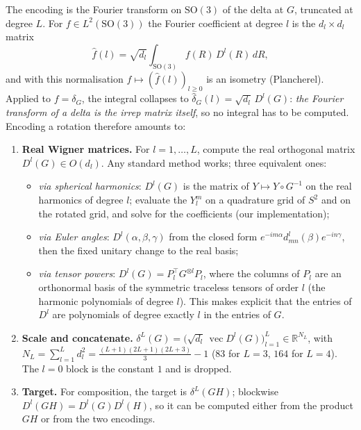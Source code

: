 \documentclass[a4paper,11pt]{article}
\theoremstyle{remark}
\theoremstyle{definition}
\newcommand{\R}{\mathbb{R}}
\newcommand{\vect}{\operatorname{vec}}
\newcommand{\SO}{\mathrm{SO}(3)}
\begin{document}
The encoding is the Fourier transform on $\SO$ of the delta at $G$, truncated at
degree $L$. For $f\in L^2(\SO)$ the Fourier coefficient at degree $l$ is the
$d_l\times d_l$ matrix
\[
\hat f(l)=\sqrt{d_l}\int_{\SO} f(R)\,D^l(R)\,dR ,
\]
and with this normalisation $f\mapsto(\hat f(l))_{l\ge0}$ is an isometry
(Plancherel). Applied to $f=\delta_G$, the integral collapses to
$\hat\delta_G(l)=\sqrt{d_l}\,D^l(G)$: \emph{the Fourier transform of a delta is
the irrep matrix itself}, so no integral has to be computed. Encoding a rotation
therefore amounts to:
\begin{enumerate}
\item \textbf{Real Wigner matrices.} For $l=1,\dots,L$, compute the real
  orthogonal matrix $D^l(G)\in O(d_l)$. Any standard method works; three
  equivalent ones:
  \begin{itemize}
  \item \emph{via spherical harmonics}: $D^l(G)$ is the matrix of
    $Y\mapsto Y\circ G^{-1}$ on the real harmonics of degree $l$; evaluate the
    $Y_l^{m}$ on a quadrature grid of $S^2$ and on the rotated grid, and solve for
    the coefficients (our implementation);
  \item \emph{via Euler angles}: $D^l(\alpha,\beta,\gamma)$ from the closed form
    $e^{-im\alpha}d^l_{mn}(\beta)e^{-in\gamma}$, then the fixed unitary change to
    the real basis;
  \item \emph{via tensor powers}: $D^l(G)=P_l^\top G^{\otimes l}P_l$, where the
    columns of $P_l$ are an orthonormal basis of the symmetric traceless tensors
    of order $l$ (the harmonic polynomials of degree $l$). This makes explicit
    that the entries of $D^l$ are polynomials of degree exactly $l$ in the
    entries of $G$.
  \end{itemize}
\item \textbf{Scale and concatenate.}
  $\delta^L(G)=\bigl(\sqrt{d_l}\,\vect D^l(G)\bigr)_{l=1}^{L}\in\R^{N_L}$, with
  $N_L=\sum_{l=1}^Ld_l^2=\tfrac{(L+1)(2L+1)(2L+3)}{3}-1$ ($83$ for $L=3$, $164$
  for $L=4$). The $l=0$ block is the constant $1$ and is dropped.
\item \textbf{Target.} For composition, the target is $\delta^L(GH)$; blockwise
  $D^l(GH)=D^l(G)D^l(H)$, so it can be computed either from the product $GH$ or
  from the two encodings.
\end{enumerate}
\end{document}

